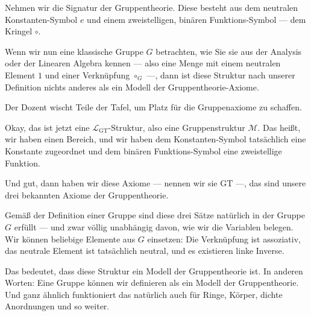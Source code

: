\begin{spoken-clean}[00:12:15 - 00:12:55]
Nehmen wir die Signatur der Gruppentheorie. Diese besteht aus dem neutralen Konstanten-Symbol $e$ und einem zweistelligen, binären Funktions-Symbol --- dem Kringel $\circ$.

Wenn wir nun eine klassische Gruppe $G$ betrachten, wie Sie sie aus der Analysis oder der Linearen Algebra kennen --- also eine Menge mit einem neutralen Element $1$ und einer Verknüpfung $\circ_G$ ---, dann ist diese Struktur nach unserer Definition nichts anderes als ein Modell der Gruppentheorie-Axiome.
\end{spoken-clean}

\begin{math-stroke}
\end{math-stroke}

\begin{lecture-break}[Tafelreinigung]
Der Dozent wischt Teile der Tafel, um Platz für die Gruppenaxiome zu schaffen.
\end{lecture-break}

\begin{spoken-clean}[00:13:50 - 00:15:47]
Okay, das ist jetzt eine $\mathcal{L}_{\text{GT}}$-Struktur, also eine Gruppenstruktur $\mathcal{M}$. Das heißt, wir haben einen Bereich, und wir haben dem Konstanten-Symbol tatsächlich eine Konstante zugeordnet und dem binären Funktions-Symbol eine zweistellige Funktion.

Und gut, dann haben wir diese Axiome --- nennen wir sie $\text{GT}$ ---, das sind unsere drei bekannten Axiome der Gruppentheorie.

Gemäß der Definition einer Gruppe sind diese drei Sätze natürlich in der Gruppe $G$ erfüllt --- und zwar völlig unabhängig davon, wie wir die Variablen belegen. Wir können beliebige Elemente aus $G$ einsetzen: Die Verknüpfung ist assoziativ, das neutrale Element ist tatsächlich neutral, und es existieren linke Inverse.

Das bedeutet, dass diese Struktur ein Modell der Gruppentheorie ist. In anderen Worten: Eine Gruppe können wir definieren als ein Modell der Gruppentheorie. Und ganz ähnlich funktioniert das natürlich auch für Ringe, Körper, dichte Anordnungen und so weiter.
\end{spoken-clean}

